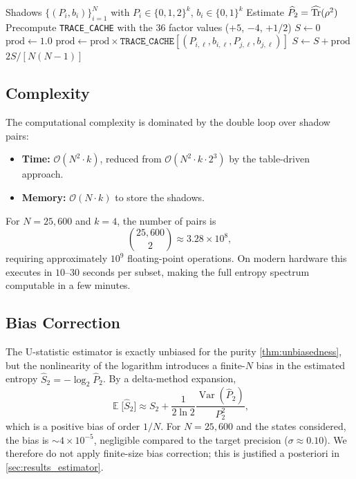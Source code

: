 \documentclass[12pt,a4paper,oneside]{book}
\theoremstyle{plain}
\theoremstyle{definition}
\theoremstyle{remark}
\DeclareMathOperator{\Var}{Var}
\DeclareMathOperator{\E}{\mathbb{E}}
\begin{document}
\begin{algorithm}[H]
\caption{Purity estimator with TRACE\_CACHE}\label{alg:estimator}
\begin{algorithmic}[1]
\Require Shadows $\{(P_i, b_i)\}_{i=1}^{N}$ with $P_i \in \{0,1,2\}^{k}$, $b_i \in \{0,1\}^{k}$
\Ensure Estimate $\widehat{P}_2 = \widehat{\Tr}(\rho^2)$
\State Precompute \texttt{TRACE\_CACHE} with the 36 factor values ($+5$, $-4$, $+1/2$)
\State $S \gets 0$
        \State $\text{prod} \gets 1.0$
            \State $\text{prod} \gets \text{prod} \times \texttt{TRACE\_CACHE}[(P_{i,\ell}, b_{i,\ell}, P_{j,\ell}, b_{j,\ell})]$
        \EndFor
        \State $S \gets S + \text{prod}$
    \EndFor
\EndFor
\State \Return $2S / [N(N-1)]$
\end{algorithmic}
\end{algorithm}

\subsection{Complexity}

The computational complexity is dominated by the double loop over shadow pairs:
\begin{itemize}[itemsep=2pt]
    \item \textbf{Time:} $\mathcal{O}(N^2 \cdot k)$, reduced from $\mathcal{O}(N^2 \cdot k \cdot 2^3)$ by the table-driven approach.
    \item \textbf{Memory:} $\mathcal{O}(N \cdot k)$ to store the shadows.
\end{itemize}

For $N = 25{,}600$ and $k = 4$, the number of pairs is
\begin{equation}
    \binom{25{,}600}{2} \approx 3.28 \times 10^8,
\end{equation}
requiring approximately $10^9$ floating-point operations. On modern hardware this executes in $10$--$30$ seconds per subset, making the full entropy spectrum computable in a few minutes.

\subsection{Bias Correction}

The U-statistic estimator is exactly unbiased for the purity \cref{thm:unbiasedness}, but the nonlinearity of the logarithm introduces a finite-$N$ bias in the estimated entropy $\widehat{S}_2 = -\log_2 \widehat{P}_2$. By a delta-method expansion,
\begin{equation}
    \E\bigl[\widehat{S}_2\bigr] \approx S_2 + \frac{1}{2 \ln 2} \frac{\Var(\widehat{P}_2)}{P_2^2},
\end{equation}
which is a positive bias of order $1/N$. For $N = 25{,}600$ and the states considered, the bias is $\sim 4 \times 10^{-5}$, negligible compared to the target precision ($\sigma \approx 0.10$). We therefore do not apply finite-size bias correction; this is justified a posteriori in \cref{sec:results_estimator}.
\end{document}
